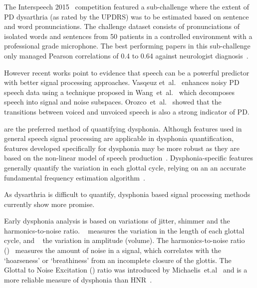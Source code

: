\documentclass[12pt, twoside]{book}
\renewcommand\emph[1]{\textit{\color{USred}{#1}}}
\begin{document}
The Interspeech 2015~\cite{compareis15pd} competition featured a sub-challenge where the extent of PD dysarthria (as rated by the UPDRS) was to be estimated based on sentence and word pronunciations. The challenge dataset consists of pronunciations of isolated words and sentences from 50 patients in a controlled environment with a professional grade microphone. The best performing papers in this sub-challenge only managed Pearson correlations of 0.4 to 0.64 against neurologist diagnosis~\cite{hahm2015parkinson,grosz2015assessingis15,williamson2015segment}.

However recent works point to evidence that speech can be a powerful predictor with better signal processing approaches. Vasqeuz et~al.~\cite{vasquez2015automatic} enhances noisy PD speech data using a technique proposed in Wang~et~al.~\cite{wang2007speechenhancement} which decomposes speech into signal and noise subspaces. Orozco~et~al.~\cite{orozco2015voiced} showed that the transitions between voiced and unvoiced speech is also a strong indicator of PD.

\emph{Sustained vowel phonations} are the preferred method of quantifying dysphonia. Although features used in general speech signal processing are applicable in dysphonia quantification, features developed specifically for dysphonia may be more robust as they are based on the non-linear model of speech production~\cite{splittledysphonia2009, splittlenonlinear2007}. Dysphonia-specific features generally quantify the variation in each glottal cycle, relying on an an accurate fundamental frequency estimation algorithm~\cite{f0estimation}. 

\begin{highlight}
As dysarthria is difficult to quantify, dysphonia based signal processing methods currently show more promise.
\end{highlight}

Early dysphonia analysis is based on variations of jitter, shimmer and the harmonics-to-noise ratio. \emph{Jitter}~ measures the variation in the length of each glottal cycle, and \emph{shimmer}~\cite{shimmerjitter,jittertime} the variation in amplitude (volume). The harmonics-to-noise ratio (\emph{HNR})~\cite{HNRintro} measures the amount of noise in a signal, which correlates with the `hoarseness' or `breathiness' from an incomplete closure of the glottis.  The Glottal to Noise Excitation (\emph{GNE}) ratio was introduced by Michaelis~et.al~\cite{gne} and is a more reliable measure of dysphonia than HNR~\cite{gneratio}. 
\end{document}
